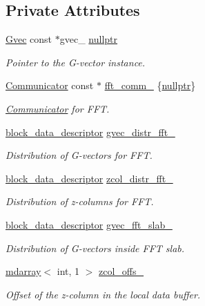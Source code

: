 \subsection*{Private Attributes}
\begin{DoxyCompactItemize}
\item 
\hyperlink{classsddk_1_1_gvec}{Gvec} const $\ast$gvec\+\_\+ \hyperlink{classsddk_1_1_gvec__partition_a56cde05772177ba83b6000269c904300}{nullptr}
\begin{DoxyCompactList}\small\item\em Pointer to the G-\/vector instance. \end{DoxyCompactList}\item 
\hyperlink{classsddk_1_1_communicator}{Communicator} const $\ast$ \hyperlink{classsddk_1_1_gvec__partition_a4473a3f2ff2630a19b9e08ff4182c5de}{fft\+\_\+comm\+\_\+} \{\hyperlink{classsddk_1_1_gvec__partition_a56cde05772177ba83b6000269c904300}{nullptr}\}
\begin{DoxyCompactList}\small\item\em \hyperlink{classsddk_1_1_communicator}{Communicator} for F\+F\+T. \end{DoxyCompactList}\item 
\hyperlink{structsddk_1_1block__data__descriptor}{block\+\_\+data\+\_\+descriptor} \hyperlink{classsddk_1_1_gvec__partition_ac2992a89220c7828c436c2d9e1d1ace1}{gvec\+\_\+distr\+\_\+fft\+\_\+}
\begin{DoxyCompactList}\small\item\em Distribution of G-\/vectors for F\+F\+T. \end{DoxyCompactList}\item 
\hyperlink{structsddk_1_1block__data__descriptor}{block\+\_\+data\+\_\+descriptor} \hyperlink{classsddk_1_1_gvec__partition_af5116728e1f4b99087fc58aaaeb7624b}{zcol\+\_\+distr\+\_\+fft\+\_\+}
\begin{DoxyCompactList}\small\item\em Distribution of z-\/columns for F\+F\+T. \end{DoxyCompactList}\item 
\hyperlink{structsddk_1_1block__data__descriptor}{block\+\_\+data\+\_\+descriptor} \hyperlink{classsddk_1_1_gvec__partition_a1bbdc7cf03e46984293f7b25e7aedd81}{gvec\+\_\+fft\+\_\+slab\+\_\+}
\begin{DoxyCompactList}\small\item\em Distribution of G-\/vectors inside F\+F\+T slab. \end{DoxyCompactList}\item 
\hyperlink{classsddk_1_1mdarray}{mdarray}$<$ int, 1 $>$ \hyperlink{classsddk_1_1_gvec__partition_a596e5213a3df246471067aec057a355e}{zcol\+\_\+offs\+\_\+}
\begin{DoxyCompactList}\small\item\em Offset of the z-\/column in the local data buffer. \end{DoxyCompactList}\end{DoxyCompactItemize}
